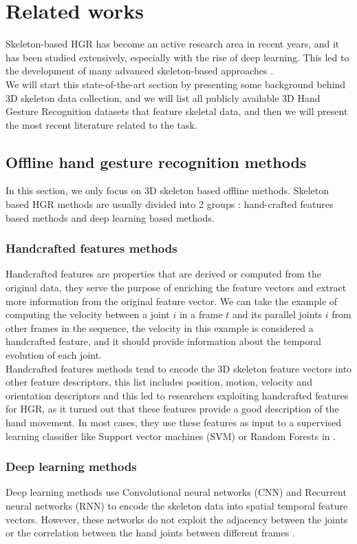 \section{Related works}
Skeleton-based HGR has become an active research area in recent years, and it has been studied extensively, especially with the rise of deep learning. This led to the development of many advanced skeleton-based approaches \cite{akremi2022spd,caputo,dhg,sem-mem-wal,res-tcn,HPEV+HMM+FRPV,st-ts-hgr-net,huang-Riemannian,huang-grassman}. \\
We will start this state-of-the-art section by presenting some background behind 3D skeleton data collection, and we will list all publicly available 3D Hand Gesture Recognition datasets that feature skeletal data, and then we will present the most recent literature related to the task.

\subsection{Offline hand gesture recognition methods}
In this section, we only focus on 3D skeleton based offline methods. Skeleton based HGR methods are usually divided into 2 groups : hand-crafted features based methods and deep learning based methods. 
\subsubsection{Handcrafted features methods}
Handcrafted features are properties that are derived or computed from the original data, they serve the purpose of enriching the feature vectors and extract more information from the original feature vector. We can take the example of computing the velocity between a joint $i$ in a frame $t$ and its parallel joints $i$ from other frames in the sequence, the velocity in this example is considered a handcrafted feature, and it should provide information about the temporal evolution of each joint. \\
Handcrafted features methods tend to encode the 3D skeleton feature vectors into other feature descriptors,  this list includes position, motion, velocity and orientation descriptors and this led to researchers exploiting handcrafted features for HGR, as it turned out that these features provide a good description of the hand movement. In most cases, they use these features as input to a supervised learning classifier like Support vector machines (SVM) or Random Forests in \cite{ohn2013joint, de2019heterogeneous, de2016skeleton}. 
\subsubsection{Deep learning methods}
Deep learning methods use Convolutional neural networks (CNN) and Recurrent neural networks (RNN) to encode the skeleton data into spatial temporal feature vectors. However, these networks do not exploit the adjacency between the joints or the correlation between the hand joints between different frames \cite{chen2017motion,nunez2018convolutional,res-tcn}.\\


